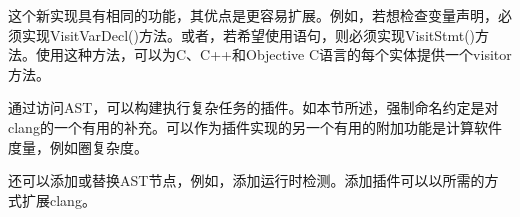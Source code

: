 这个新实现具有相同的功能，其优点是更容易扩展。例如，若想检查变量声明，必须实现VisitVarDecl()方法。或者，若希望使用语句，则必须实现VisitStmt()方法。使用这种方法，可以为C、C++和Objective C语言的每个实体提供一个visitor方法。

通过访问AST，可以构建执行复杂任务的插件。如本节所述，强制命名约定是对clang的一个有用的补充。可以作为插件实现的另一个有用的附加功能是计算软件度量，例如圈复杂度。

还可以添加或替换AST节点，例如，添加运行时检测。添加插件可以以所需的方式扩展clang。





























